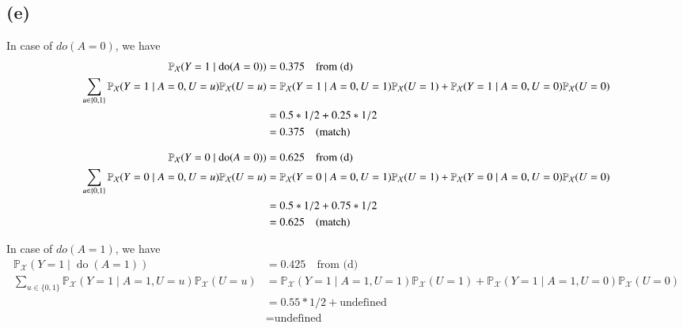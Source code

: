 \documentclass[10pt]{article}
\begin{document}
\subsection{(e)}
In case of $do(A=0)$, we have
\begin{align*}
    \mathbb{P}_{\mathcal{X}}(Y=1 \mid \operatorname{do}(A=0))&=0.375 \quad \text{from (d)}\\
    \sum_{u \in\{0,1\}} \mathbb{P}_{\mathcal{X}}(Y=1 \mid A=0, U=u) \mathbb{P}_{\mathcal{X}}(U=u)&=\mathbb{P}_{\mathcal{X}}(Y=1 \mid A=0, U=1) \mathbb{P}_{\mathcal{X}}(U=1) + \mathbb{P}_{\mathcal{X}}(Y=1 \mid A=0, U=0) \mathbb{P}_{\mathcal{X}}(U=0)\\
    &= 0.5 * 1/2 + 0.25 * 1/2\\
    &= 0.375 \text{\quad (match)}
\end{align*}

\begin{align*}
    \mathbb{P}_{\mathcal{X}}(Y=0 \mid \operatorname{do}(A=0))&=0.625 \quad \text{from (d)}\\
    \sum_{u \in\{0,1\}} \mathbb{P}_{\mathcal{X}}(Y=0 \mid A=0, U=u) \mathbb{P}_{\mathcal{X}}(U=u)&=\mathbb{P}_{\mathcal{X}}(Y=0 \mid A=0, U=1) \mathbb{P}_{\mathcal{X}}(U=1) + \mathbb{P}_{\mathcal{X}}(Y=0 \mid A=0, U=0) \mathbb{P}_{\mathcal{X}}(U=0)\\
    &= 0.5 * 1/2 + 0.75 * 1/2\\
    &= 0.625 \text{\quad (match)}
\end{align*}

In case of $do(A=1)$, we have
\begin{align*}
    \mathbb{P}_{\mathcal{X}}(Y=1 \mid \operatorname{do}(A=1))&=0.425 \quad \text{from (d)}\\
    \sum_{u \in\{0,1\}} \mathbb{P}_{\mathcal{X}}(Y=1 \mid A=1, U=u) \mathbb{P}_{\mathcal{X}}(U=u)&=\mathbb{P}_{\mathcal{X}}(Y=1 \mid A=1, U=1) \mathbb{P}_{\mathcal{X}}(U=1) + \mathbb{P}_{\mathcal{X}}(Y=1 \mid A=1, U=0) \mathbb{P}_{\mathcal{X}}(U=0)\\
    &= 0.55 * 1/2 + \text{undefined}\\
    &= \text{undefined}
\end{align*}
\end{document}
